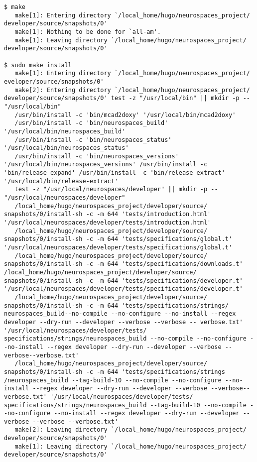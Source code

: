 \documentclass[12pt]{article}
\begin{document}
\begin{enumerate}
\begin{verbatim}
$ make
   make[1]: Entering directory `/local_home/hugo/neurospaces_project/ developer/source/snapshots/0'
   make[1]: Nothing to be done for `all-am'.
   make[1]: Leaving directory `/local_home/hugo/neurospaces_project/ developer/source/snapshots/0'

$ sudo make install
   make[1]: Entering directory `/local_home/hugo/neurospaces_project/ eveloper/source/snapshots/0'
   make[2]: Entering directory `/local_home/hugo/neurospaces_project/ developer/source/snapshots/0' test -z "/usr/local/bin" || mkdir -p -- "/usr/local/bin"
   /usr/bin/install -c 'bin/mcad2doxy' '/usr/local/bin/mcad2doxy'
   /usr/bin/install -c 'bin/neurospaces_build' '/usr/local/bin/neurospaces_build'
   /usr/bin/install -c 'bin/neurospaces_status' '/usr/local/bin/neurospaces_status'
   /usr/bin/install -c 'bin/neurospaces_versions' '/usr/local/bin/neurospaces_versions' /usr/bin/install -c 'bin/release-expand' /usr/bin/install -c 'bin/release-extract' '/usr/local/bin/release-extract'
   test -z "/usr/local/neurospaces/developer" || mkdir -p -- "/usr/local/neurospaces/developer"
   /local_home/hugo/neurospaces_project/developer/source/ snapshots/0/install-sh -c -m 644 'tests/introduction.html' '/usr/local/neurospaces/developer/tests/introduction.html'
   /local_home/hugo/neurospaces_project/developer/source/ snapshots/0/install-sh -c -m 644 'tests/specifications/global.t' '/usr/local/neurospaces/developer/tests/specifications/global.t'
   /local_home/hugo/neurospaces_project/developer/source/ snapshots/0/install-sh -c -m 644 'tests/specifications/downloads.t' /local_home/hugo/neurospaces_project/developer/source/ snapshots/0/install-sh -c -m 644 'tests/specifications/developer.t'  '/usr/local/neurospaces/developer/tests/specifications/developer.t'
   /local_home/hugo/neurospaces_project/developer/source/ snapshots/0/install-sh -c -m 644 'tests/specifications/strings/ neurospaces_build--no-compile --no-configure --no-install --regex developer --dry-run --developer --verbose --verbose -- verbose.txt' '/usr/local/neurospaces/developer/tests/ specifications/strings/neurospaces_build --no-compile --no-configure --no-install --regex developer --dry-run --developer --verbose --verbose--verbose.txt'
   /local_home/hugo/neurospaces_project/developer/source/ snapshots/0/install-sh -c -m 644 'tests/specifications/strings /neurospaces_build --tag-build-10 --no-compile --no-configure --no-install --regex developer --dry-run --developer --verbose --verbose--verbose.txt' '/usr/local/neurospaces/developer/tests/ specifications/strings/neurospaces_build --tag-build-10 --no-compile --no-configure --no-install --regex developer --dry-run --developer --verbose --verbose --verbose.txt'
   make[2]: Leaving directory `/local_home/hugo/neurospaces_project/ developer/source/snapshots/0'
   make[1]: Leaving directory `/local_home/hugo/neurospaces_project/ developer/source/snapshots/0'


\end{verbatim}
\end{enumerate}
\end{document}
